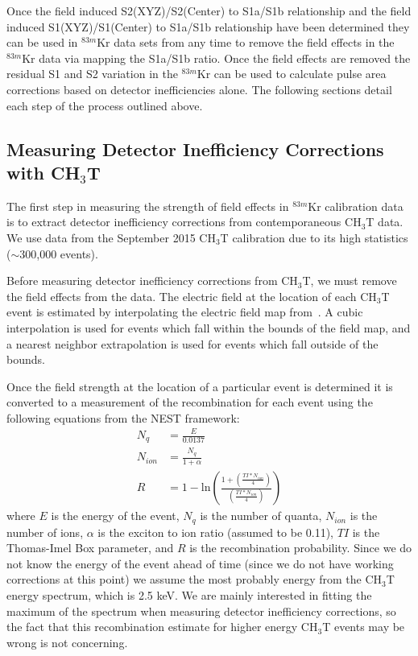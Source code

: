 Once the field induced S2(XYZ)/S2(Center) to S1a/S1b relationship and the field induced S1(XYZ)/S1(Center) to S1a/S1b relationship have been determined they can be used in $^{83m}$Kr data sets from any time to remove the field effects in the $^{83m}$Kr data via mapping the S1a/S1b ratio.  Once the field effects are removed the residual S1 and S2 variation in the $^{83m}$Kr can be used to calculate pulse area corrections based on detector inefficiencies alone. The following sections detail each step of the process outlined above.

\subsection{Measuring Detector Inefficiency Corrections with CH$_3$T}

The first step in measuring the strength of field effects in $^{83m}$Kr calibration data is to extract detector inefficiency corrections from contemporaneous CH$_3$T data.  We use data from the September 2015 CH$_3$T calibration due to its high statistics ($\sim$300,000 events). 

Before measuring detector inefficiency corrections from CH$_3$T, we must remove the field effects from the data.   The electric field at the location of each CH$_3$T event is estimated by interpolating the electric field map from~\cite{LuciesPaper}.  A cubic interpolation is used for events which fall within the bounds of the field map, and a nearest neighbor extrapolation is used for events which fall outside of the bounds.   

Once the field strength at the location of a particular event is determined it is converted to a measurement of the recombination for each event using the following equations from the NEST framework:
\begin{align}
N_q &= \frac{E}{0.0137} \label{NqEq} \\
N_{ion} &= \frac{N_q}{1+\alpha} \label{NionEq} \\
R &= 1-\mbox{ln} \left( \frac{1+(\frac{TI*N_{ion}}{4})}{(\frac{TI*N_{ion}}{4})} \right)
\end{align}
where $E$ is the energy of the event, $N_q$ is the number of quanta, $N_{ion}$ is the number of ions, $\alpha$ is the exciton to ion ratio (assumed to be 0.11), $TI$ is the Thomas-Imel Box parameter, and $R$ is the recombination probability.  Since we do not know the energy of the event ahead of time (since we do not have working corrections at this point) we assume the most probably energy from the CH$_3$T energy spectrum, which is 2.5 keV.  We are mainly interested in fitting the maximum of the spectrum when measuring detector inefficiency corrections, so the fact that this recombination estimate for higher energy CH$_3$T events may be wrong is not concerning.  

